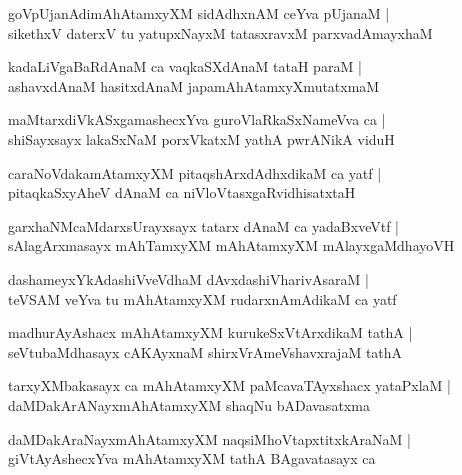 \documentclass[twoside,12pt,openright]{book}
\newcounter{shloka}[chapter]
\begin{document}
\begin{shloka}%
goVpUjanAdimAhAtamxyXM sidAdhxnAM ceYva pUjanaM |\\
sikethxV daterxV tu yatupxNayxM tatasxravxM parxvadAmayxhaM 
\end{shloka}

\begin{shloka}%
kadaLiVgaBaRdAnaM ca vaqkaSXdAnaM tataH paraM |\\
ashavxdAnaM hasitxdAnaM japamAhAtamxyXmutatxmaM 
\end{shloka}

\begin{shloka}%
maMtarxdiVkASxgamashecxYva guroVlaRkaSxNameVva ca |\\
shiSayxsayx lakaSxNaM porxVkatxM yathA pwrANikA viduH 
\end{shloka}

\begin{shloka}%
caraNoVdakamAtamxyXM pitaqshArxdAdhxdikaM ca yatf |\\
pitaqkaSxyAheV dAnaM ca niVloVtasxgaRvidhisatxtaH 
\end{shloka}

\begin{shloka}%
garxhaNMcaMdarxsUrayxsayx tatarx dAnaM ca yadaBxveVtf |\\
sAlagArxmasayx mAhTamxyXM mAhAtamxyXM mAlayxgaMdhayoVH
\end{shloka}

\begin{shloka}%
dashameyxYkAdashiVveVdhaM dAvxdashiVharivAsaraM |\\
teVSAM veYva tu mAhAtamxyXM rudarxnAmAdikaM ca yatf 
\end{shloka}

\begin{shloka}%
madhurAyAshacx mAhAtamxyXM kurukeSxVtArxdikaM tathA |\\
seVtubaMdhasayx cAKAyxnaM shirxVrAmeVshavxrajaM tathA 
\end{shloka}

\begin{shloka}%
tarxyXMbakasayx ca mAhAtamxyXM paMcavaTAyxshacx yataPxlaM |\\
daMDakArANayxmAhAtamxyXM shaqNu bADavasatxma 
\end{shloka}

\begin{shloka}%
daMDakAraNayxmAhAtamxyXM naqsiMhoVtapxtitxkAraNaM |\\
giVtAyAshecxYva mAhAtamxyXM tathA BAgavatasayx ca 
\end{shloka}
\end{document}
